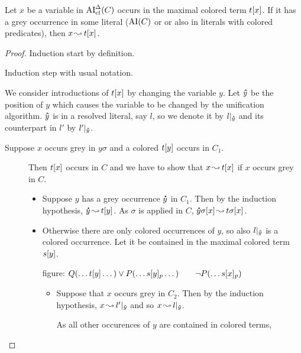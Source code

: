 \documentclass[,%
	paper=a4,%
	DIV11, %
	twoside=false,%
	liststotoc,
	bibtotoc,
	draft=false,%
	numbers=noendperiod
]{scrartcl}
\begin{document}


\begin{clemma}
	\label{lemma:arrow_from_grey_to_colored}
	Let $x$ be a variable in $\operatorname{AI}_\mathrm{cl}^\Delta(C)$ occurs in the maximal colored term $t[x]$.
	If it has a grey occurrence in some literal ($\operatorname{AI}(C)$ or or also in literals with colored predicates), then $x\operatorname{\leadsto} t[x]$.
\end{clemma}
\begin{proof}
	Induction start by definition.

	Induction step with usual notation.

	We consider introductions of $t[x]$ by changing the variable $y$.
	Let $\bm\hat y$ be the position of $y$ which causes the variable to be changed by the unification algorithm.
	$\bm\hat y$ is in a resolved literal, say $l$, so we denote it by $l|_{\bm\hat y}$ and its counterpart in $l'$ by $l'|_{\bm\hat y}$. 

	\begin{description}
		\item[Suppose $x$ occurs grey in $y\sigma$ and a colored $t[y]$ occurs in $C_1$.]
			Then $t[x]$ occurs in $C$ and we have to show that $x\operatorname{\leadsto} t[x]$ if $x$ occurs grey in $C$.

			\begin{itemize}
				\item Suppose $y$ has a grey occurrence $\bm\dot y$ in $C_1$.
					Then by the induction hypothesis, $\bm\dot y\operatorname{\leadsto} t[y]$. 
					As $\sigma$ is applied in $C$, $\bm\dot y\sigma[x]\operatorname{\leadsto} t\sigma[x]$.

				\item Otherwise there are only colored occurrences of $y$, so also $l|_{\bm\hat y}$ is a colored occurrence. Let it be contained in the maximal colored term $s[y]$.

					figure: $Q(\dots t[y] \dots) \lor P(\dots s{[y]_{p}} \dots)\quad\quad \lnot P(\dots s{[x]_{p}})$

					\begin{itemize}
						\item Suppose that $x$ occurs grey in $C_2$. Then by the induction hypothesis, $x\operatorname{\leadsto} l'|_{\bm\hat y}$ and so
							$x\operatorname{\leadsto} l|_{\bm\hat y}$.

							As all other occurences of $y$ are contained in colored terms,  
							

\end{itemize}
\end{itemize}
\end{description}
\end{proof}
\end{document}
